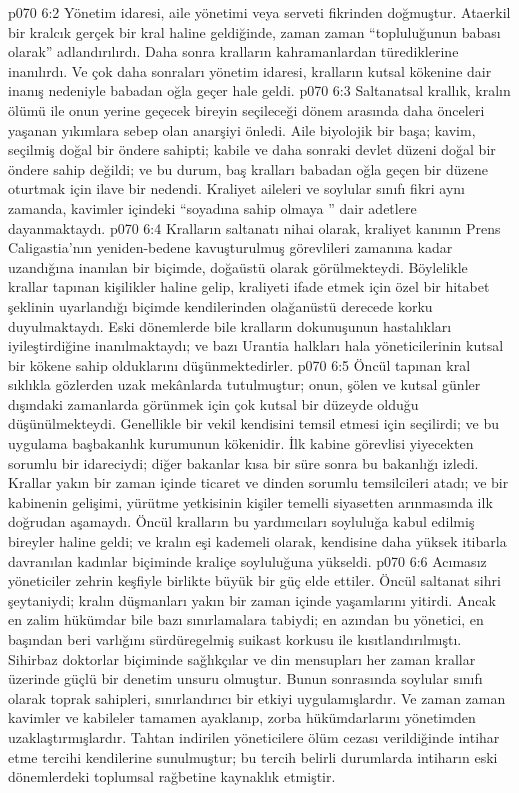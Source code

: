 \vs p070 6:2 Yönetim idaresi, aile yönetimi veya serveti fikrinden doğmuştur. Ataerkil bir kralcık gerçek bir kral haline geldiğinde, zaman zaman “topluluğunun babası olarak” adlandırılırdı. Daha sonra kralların kahramanlardan türediklerine inanılırdı. Ve çok daha sonraları yönetim idaresi, kralların kutsal kökenine dair inanış nedeniyle babadan oğla geçer hale geldi.
\vs p070 6:3 Saltanatsal krallık, kralın ölümü ile onun yerine geçecek bireyin seçileceği dönem arasında daha önceleri yaşanan yıkımlara sebep olan anarşiyi önledi. Aile biyolojik bir başa; kavim, seçilmiş doğal bir öndere sahipti; kabile ve daha sonraki devlet düzeni doğal bir öndere sahip değildi; ve bu durum, baş kralları babadan oğla geçen bir düzene oturtmak için ilave bir nedendi. Kraliyet aileleri ve soylular sınıfı fikri aynı zamanda, kavimler içindeki “soyadına sahip olmaya ” dair adetlere dayanmaktaydı.
\vs p070 6:4 Kralların saltanatı nihai olarak, kraliyet kanının Prens Caligastia’nın yeniden\hyp{}bedene kavuşturulmuş görevlileri zamanına kadar uzandığına inanılan bir biçimde, doğaüstü olarak görülmekteydi. Böylelikle krallar tapınan kişilikler haline gelip, kraliyeti ifade etmek için özel bir hitabet şeklinin uyarlandığı biçimde kendilerinden olağanüstü derecede korku duyulmaktaydı. Eski dönemlerde bile kralların dokunuşunun hastalıkları iyileştirdiğine inanılmaktaydı; ve bazı Urantia halkları hala yöneticilerinin kutsal bir kökene sahip olduklarını düşünmektedirler.
\vs p070 6:5 Öncül tapınan kral sıklıkla gözlerden uzak mekânlarda tutulmuştur; onun, şölen ve kutsal günler dışındaki zamanlarda görünmek için çok kutsal bir düzeyde olduğu düşünülmekteydi. Genellikle bir vekil kendisini temsil etmesi için seçilirdi; ve bu uygulama başbakanlık kurumunun kökenidir. İlk kabine görevlisi yiyecekten sorumlu bir idareciydi; diğer bakanlar kısa bir süre sonra bu bakanlığı izledi. Krallar yakın bir zaman içinde ticaret ve dinden sorumlu temsilcileri atadı; ve bir kabinenin gelişimi, yürütme yetkisinin kişiler temelli siyasetten arınmasında ilk doğrudan aşamaydı. Öncül kralların bu yardımcıları soyluluğa kabul edilmiş bireyler haline geldi; ve kralın eşi kademeli olarak, kendisine daha yüksek itibarla davranılan kadınlar biçiminde kraliçe soyluluğuna yükseldi.
\vs p070 6:6 Acımasız yöneticiler zehrin keşfiyle birlikte büyük bir güç elde ettiler. Öncül saltanat sihri şeytaniydi; kralın düşmanları yakın bir zaman içinde yaşamlarını yitirdi. Ancak en zalim hükümdar bile bazı sınırlamalara tabiydi; en azından bu yönetici, en başından beri varlığını sürdüregelmiş suikast korkusu ile kısıtlandırılmıştı. Sihirbaz doktorlar biçiminde sağlıkçılar ve din mensupları her zaman krallar üzerinde güçlü bir denetim unsuru olmuştur. Bunun sonrasında soylular sınıfı olarak toprak sahipleri, sınırlandırıcı bir etkiyi uygulamışlardır. Ve zaman zaman kavimler ve kabileler tamamen ayaklanıp, zorba hükümdarlarını yönetimden uzaklaştırmışlardır. Tahtan indirilen yöneticilere ölüm cezası verildiğinde intihar etme tercihi kendilerine sunulmuştur; bu tercih belirli durumlarda intiharın eski dönemlerdeki toplumsal rağbetine kaynaklık etmiştir.
